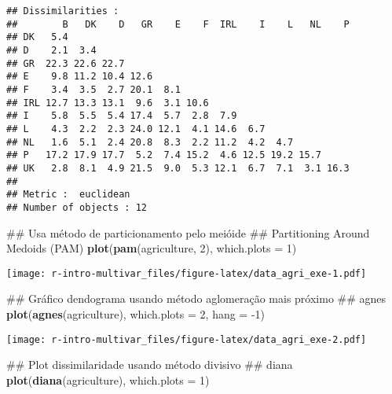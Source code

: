 \documentclass[]{book}
\newenvironment{Shaded}{\begin{snugshade}}{\end{snugshade}}
\newcommand{\KeywordTok}[1]{\textcolor[rgb]{0.13,0.29,0.53}{\textbf{{#1}}}}
\newcommand{\DataTypeTok}[1]{\textcolor[rgb]{0.13,0.29,0.53}{{#1}}}
\newcommand{\DecValTok}[1]{\textcolor[rgb]{0.00,0.00,0.81}{{#1}}}
\newcommand{\NormalTok}[1]{{#1}}
\begin{document}
\begin{verbatim}
## Dissimilarities :
##        B   DK    D   GR    E    F  IRL    I    L   NL    P
## DK   5.4                                                  
## D    2.1  3.4                                             
## GR  22.3 22.6 22.7                                        
## E    9.8 11.2 10.4 12.6                                   
## F    3.4  3.5  2.7 20.1  8.1                              
## IRL 12.7 13.3 13.1  9.6  3.1 10.6                         
## I    5.8  5.5  5.4 17.4  5.7  2.8  7.9                    
## L    4.3  2.2  2.3 24.0 12.1  4.1 14.6  6.7               
## NL   1.6  5.1  2.4 20.8  8.3  2.2 11.2  4.2  4.7          
## P   17.2 17.9 17.7  5.2  7.4 15.2  4.6 12.5 19.2 15.7     
## UK   2.8  8.1  4.9 21.5  9.0  5.3 12.1  6.7  7.1  3.1 16.3
## 
## Metric :  euclidean 
## Number of objects : 12
\end{verbatim}

\begin{Shaded}
\begin{Highlighting}[]
\NormalTok{## Usa método de particionamento pelo meióide }
\NormalTok{## Partitioning Around Medoids (PAM)}
\KeywordTok{plot}\NormalTok{(}\KeywordTok{pam}\NormalTok{(agriculture, }\DecValTok{2}\NormalTok{), }\DataTypeTok{which.plots =} \DecValTok{1}\NormalTok{)}
\end{Highlighting}
\end{Shaded}

\texttt{[image: r-intro-multivar\_files/figure-latex/data\_agri\_exe-1.pdf]}

\begin{Shaded}
\begin{Highlighting}[]
\NormalTok{## Gráfico dendograma usando método aglomeração mais próximo}
\NormalTok{## agnes}
\KeywordTok{plot}\NormalTok{(}\KeywordTok{agnes}\NormalTok{(agriculture), }\DataTypeTok{which.plots =} \DecValTok{2}\NormalTok{, }\DataTypeTok{hang =} \NormalTok{-}\DecValTok{1}\NormalTok{)}
\end{Highlighting}
\end{Shaded}

\texttt{[image: r-intro-multivar\_files/figure-latex/data\_agri\_exe-2.pdf]}

\begin{Shaded}
\begin{Highlighting}[]
\NormalTok{## Plot dissimilaridade usando método divisivo}
\NormalTok{## diana}
\KeywordTok{plot}\NormalTok{(}\KeywordTok{diana}\NormalTok{(agriculture), }\DataTypeTok{which.plots =} \DecValTok{1}\NormalTok{)}
\end{Highlighting}
\end{Shaded}
\end{document}
